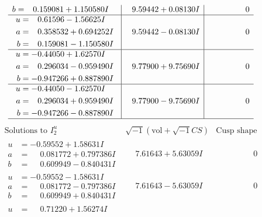 \documentclass[1p]{elsarticle_modified}
\theoremstyle{definition}
\newcommand{\I}{\sqrt{-1}}
\begin{document}
$$\begin{array}{c|c|c}
\begin{aligned}
b &= \phantom{-}0.159081 + 1.150580 I\end{aligned}
 & \phantom{-}9.59442 + 0.08130 I & \phantom{-0.000000 } 0 \\ \hline\begin{aligned}
u &= \phantom{-}0.61596 - 1.56625 I \\
a &= \phantom{-}0.358532 + 0.694252 I \\
b &= \phantom{-}0.159081 - 1.150580 I\end{aligned}
 & \phantom{-}9.59442 - 0.08130 I & \phantom{-0.000000 } 0 \\ \hline\begin{aligned}
u &= -0.44050 + 1.62570 I \\
a &= \phantom{-}0.296034 - 0.959490 I \\
b &= -0.947266 + 0.887890 I\end{aligned}
 & \phantom{-}9.77900 + 9.75690 I & \phantom{-0.000000 } 0 \\ \hline\begin{aligned}
u &= -0.44050 - 1.62570 I \\
a &= \phantom{-}0.296034 + 0.959490 I \\
b &= -0.947266 - 0.887890 I\end{aligned}
 & \phantom{-}9.77900 - 9.75690 I & \phantom{-0.000000 } 0\\
 \hline 
 \end{array}$$\newpage$$\begin{array}{c|c|c}  
\text{Solutions to }I^u_{2}& \I (\text{vol} + \sqrt{-1}CS) & \text{Cusp shape}\\
 \hline 
\begin{aligned}
u &= -0.59552 + 1.58631 I \\
a &= \phantom{-}0.081772 + 0.797386 I \\
b &= \phantom{-}0.609949 - 0.840431 I\end{aligned}
 & \phantom{-}7.61643 + 5.63059 I & \phantom{-0.000000 } 0 \\ \hline\begin{aligned}
u &= -0.59552 - 1.58631 I \\
a &= \phantom{-}0.081772 - 0.797386 I \\
b &= \phantom{-}0.609949 + 0.840431 I\end{aligned}
 & \phantom{-}7.61643 - 5.63059 I & \phantom{-0.000000 } 0 \\ \hline\begin{aligned}
u &= \phantom{-}0.71220 + 1.56274 I \\

\end{aligned}
\end{array}$$
\end{document}
